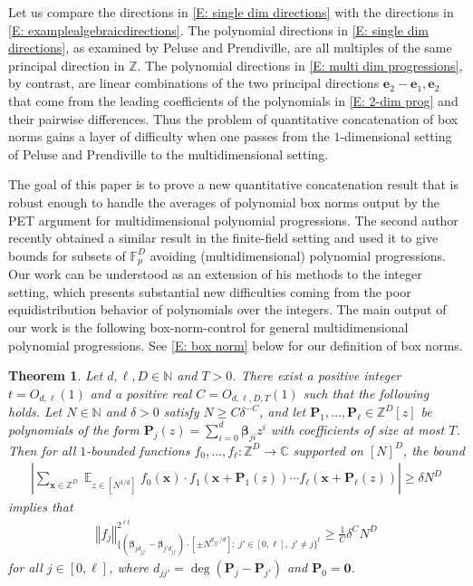 \documentclass[11pt]{amsart}
\newtheorem{theorem}[lemma]{Theorem}
\theoremstyle{definition}
\DeclareMathOperator*{\E}{\mathbb{E}}
\newcommand{\C}{{\mathbb C}}
\newcommand{\F}{{\mathbb F}}
\newcommand{\N}{{\mathbb N}}
\newcommand{\Z}{{\mathbb Z}}
\newcommand{\be}{{\mathbf{e}}}
\newcommand{\bp}{{\mathbf{P}}}
\newcommand{\p}{{\mathbf{P}}}
\newcommand{\bx}{{\mathbf{x}}}
\newcommand{\bbeta}{{\boldsymbol{\beta}}}
\newcommand{\norm}[1]{\left\Vert #1\right\Vert}
\newcommand{\abs}[1]{\mathopen{}\left| #1\mathclose{}\right|}
\begin{document}
Let us compare the directions in \eqref{E: single dim directions} with the directions in \eqref{E: examplealgebraicdirections}.  The polynomial directions in \eqref{E: single dim directions}, as examined by Peluse and Prendiville, are all multiples of the same principal direction in $\Z$.  The polynomial directions in \eqref{E: multi dim progressions}, by contrast, are linear combinations of the two principal directions $\be_2-\be_1, \be_2$ that come from the leading coefficients of the polynomials in \eqref{E: 2-dim prog} and their pairwise differences.  Thus the problem of quantitative concatenation of box norms gains a layer of difficulty when one passes from the $1$-dimensional setting of Peluse and Prendiville to the multidimensional setting.

The goal of this paper is to prove a new quantitative concatenation result that is robust enough to handle the averages of polynomial box norms output by the PET argument for multidimensional polynomial progressions. {The second author~\cite{Kuc23} recently obtained a similar result in the finite-field setting and used it to give bounds for subsets of $\F_p^D$ avoiding (multidimensional) polynomial progressions.  Our work can be understood as an extension of his methods to the integer setting, which presents substantial new difficulties coming from the poor equidistribution behavior of polynomials over the integers.}  The main output of our work is the following box-norm-control for general multidimensional polynomial progressions.  See \eqref{E: box norm} below for our definition of box norms.

\begin{theorem}\label{T: single box norm bound simplified}
Let $d, \ell,D \in \N$ and $T>0$.  There exist a positive integer $t=O_{d, \ell}(1)$ and a positive real $C=O_{d,\ell,D,T}(1)$ such that the following holds.  Let $N \in \N$ and $\delta>0$ satisfy $N\geq C\delta^{-C}$,  and let $\bp_1, \ldots, \bp_\ell\in\Z^D[z]$ be  polynomials of the form $\bp_j(z) = \sum_{i=0}^d \bbeta_{ji}z^i$ with coefficients of size at most $T$. %
Then for all $1$-bounded functions $f_0, \ldots, f_\ell:\Z^D\to\C$ supported on $[N]^D$, the bound
    \begin{align}\label{E: concatenation of polynomials assumption -1}
            \abs{\sum_{\bx\in\Z^D}\E_{z\in[N^{1/d}]}
            f_0(\bx)\cdot f_1(\bx+\p_1(z))\cdots f_\ell(\bx+\p_\ell(z))} \geq \delta N^D
    \end{align}
    implies that
    \begin{align}\label{E: the box norm -1}
        \norm{f_j}_{\{(\bbeta_{jd_{jj'}}-\bbeta_{j'd_{jj'}})\cdot[\pm N^{d_{jj'}/d}]:\; j'\in[0,\ell],\; j'\neq j\}^{ t}}^{2^{\ell t}}\geq \frac{1}{C}\delta^{C}N^{D}
    \end{align}
    for all $j\in[0,\ell]$, where $d_{jj'} = \deg (\bp_j - \bp_{j'})$ and $\bp_0 = \mathbf{0}$. 
\end{theorem}
\end{document}
